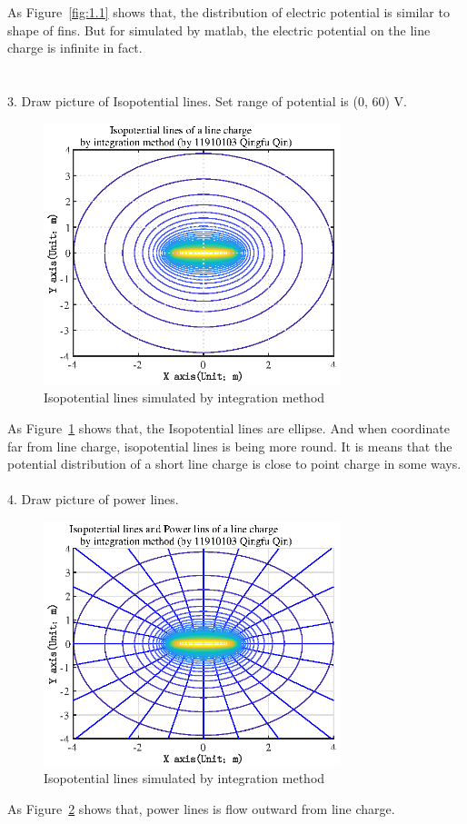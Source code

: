 \documentclass[10pt, journal, final]{IEEEtran}
\begin{document}
As Figure~\ref{fig:1.1} shows that,
the distribution of electric potential is similar to shape of fins.
But for simulated by matlab,
the electric potential on the line charge is infinite in fact.\\
\\
\\
3. Draw picture of Isopotential lines.
Set range of potential is (0, 60) V.

\label{work1.3}
\begin{figure}[htbp]
    \centering
    \includegraphics[width = 3.4in]{figures/fig1.2.eps}
    \caption{Isopotential lines simulated by integration method}
    \label{fig:1.2}
\end{figure}
As Figure~\ref{fig:1.2} shows that, the Isopotential lines are ellipse.
And when coordinate far from line charge, isopotential lines is being more round.
It is means that the potential distribution of a short line charge
is close to point charge in some ways.\\
\\
4. Draw picture of power lines.

\label{work1.4}
\begin{figure}[htbp]
    \centering
    \includegraphics[width = 3.4in]{figures/fig1.3.eps}
    \caption{Isopotential lines simulated by integration method}
    \label{fig:1.3}
\end{figure}
As Figure~\ref{fig:1.3} shows that, power lines is flow outward from line charge.
\end{document}

